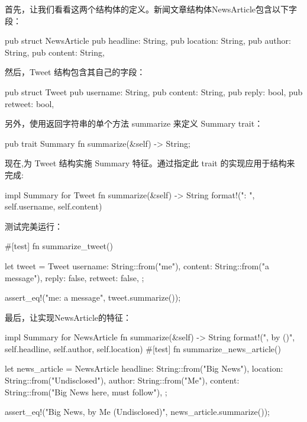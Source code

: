 首先，让我们看看这两个结构体的定义。新闻文章结构体NewsArticle包含以下字段：

\begin{rust}
pub struct NewsArticle {
  pub headline: String,
  pub location: String,
  pub author: String,
  pub content: String,
}
\end{rust}

然后，Tweet 结构包含其自己的字段：

\begin{rust}
pub struct Tweet {
  pub username: String,
  pub content: String,
  pub reply: bool,
  pub retweet: bool,
}
\end{rust}

另外，使用返回字符串的单个方法 summarize 来定义 Summary trait：

\begin{rust}
pub trait Summary {
  fn summarize(&self) -> String;
}
\end{rust}

现在,为 Tweet 结构实施 Summary 特征。通过指定此 trait 的实现应用于结构来完成:

\begin{rust}
impl Summary for Tweet {
  fn summarize(&self) -> String {
    format!("{}: {}", self.username, self.content)
  }
}
\end{rust}

测试完美运行：

\begin{rust}
#[test]
fn summarize_tweet() {
  let tweet = Tweet {
    username: String::from("me"),
    content: String::from("a message"),
    reply: false,
    retweet: false,
  };

  assert_eq!("me: a message", tweet.summarize());
}
\end{rust}

最后，让实现NewsArticle的特征：

\begin{rust}
impl Summary for NewsArticle {
  fn summarize(&self) -> String {
    format!("{}, by {} ({})", self.headline, self.author, self.location)
  }
}
#[test]
  fn summarize_news_article() {
    let news_article = NewsArticle {
      headline: String::from("Big News"),
      location: String::from("Undisclosed"),
      author: String::from("Me"),
      content: String::from("Big News here, must follow"),
    };

    assert_eq!("Big News, by Me (Undisclosed)", news_article.summarize());
  }
\end{rust}

